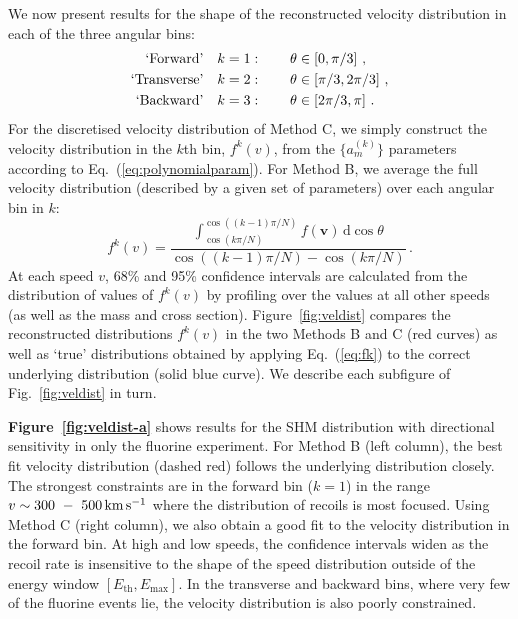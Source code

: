 We now present results for the shape of the reconstructed velocity distribution in each of the three angular bins:
\begin{align}\label{eq:bins}
\begin{split}
{\rm `Forward\textrm{'}}\quad &k = 1: \qquad \theta \in \left[ 0, \pi/3\right]\,, \\
{\rm `Transverse\textrm{'}}\quad &k = 2: \qquad \theta \in \left[ \pi/3, 2\pi/3 \right]\,, \\
{\rm `Backward\textrm{'}}\quad &k = 3: \qquad \theta \in \left[ 2\pi/3, \pi\right]\,. \\
\end{split}
\end{align}
For the discretised velocity distribution of Method C, we simply construct the velocity distribution in the $k$th bin, $f^k(v)$, from the $\{a_m^{(k)}\}$ parameters according to Eq.~(\ref{eq:polynomialparam}). For Method B, we average the full velocity distribution (described by a given set of parameters) over each angular bin in $k$:
\begin{equation}\label{eq:fk}
f^{k}(v) = \frac{\int_{\cos(k\pi/N)}^{\cos((k-1)\pi/N)} f(\mathbf{v}) \, \mathrm{d}\cos\theta}{\cos((k-1)\pi/N) - \cos(k\pi/N)}\,.
\end{equation}
At each speed $v$, 68\% and 95\% confidence intervals are calculated from the distribution of values of $f^k(v)$ by profiling over the values at all other speeds (as well as the mass and cross section). Figure~\ref{fig:veldist} compares the reconstructed distributions $f^k(v)$ in the two Methods B and C (red curves) as well as `true' distributions obtained by applying Eq.~(\ref{eq:fk}) to the correct underlying distribution (solid blue curve). We describe each subfigure of Fig.~\ref{fig:veldist} in turn.

{\bf Figure~\ref{fig:veldist-a}} shows results for the SHM distribution with directional sensitivity in only the fluorine experiment. For Method B (left column), the best fit velocity distribution (dashed red) follows the underlying distribution closely. The strongest constraints are in the forward bin ($k=1$) in the range $v \sim 300~-~500 \,{\rm km\,s^{-1}}$ where the distribution of recoils is most focused. Using Method C (right column), we also obtain a good fit to the velocity distribution in the forward bin. At high and low speeds, the confidence intervals widen as the recoil rate is insensitive to the shape of the speed distribution outside of the energy window $[E_\mathrm{th}, E_\mathrm{max}]$. In the transverse and backward bins, where very few of the fluorine events lie, the velocity distribution is also poorly constrained.

